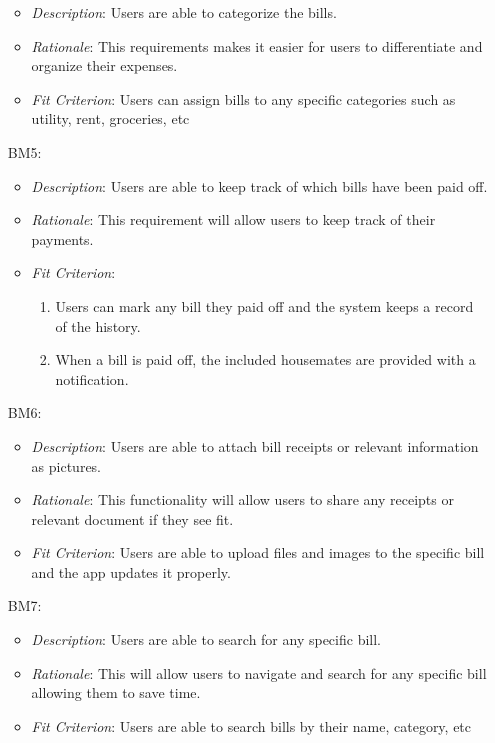 \documentclass[12pt]{article}
\begin{document}
\begin{itemize}
\begin{itemize}
        \item \textit{Description}: Users are able to categorize the bills.
        \item \textit{Rationale}: This requirements makes it easier for users to differentiate and organize their expenses.
        \item \textit{Fit Criterion}: Users can assign bills to any specific categories such as utility, rent, groceries, etc
    \end{itemize}
    \item[BM5:] 
    \begin{itemize}
        \item \textit{Description}: Users are able to keep track of which bills have been paid off.
        \item \textit{Rationale}: This requirement will allow users to keep track of their payments.
        \item \textit{Fit Criterion}: 
        \begin{enumerate}
            \item Users can mark any bill they paid off and the system keeps a record of the history.
            \item When a bill is paid off, the included housemates are provided with a notification.
        \end{enumerate}
    \end{itemize}
    \item[BM6:] 
    \begin{itemize}
        \item \textit{Description}: Users are able to attach bill receipts or relevant information as pictures.
        \item \textit{Rationale}: This functionality will allow users to share any receipts or relevant document if they see fit.
        \item \textit{Fit Criterion}: Users are able to upload files and images to the specific bill and the app updates it properly.
    \end{itemize}
    \item[BM7:] 
    \begin{itemize}
        \item \textit{Description}: Users are able to search for any specific bill.
        \item \textit{Rationale}: This will allow users to navigate and search for any specific bill allowing them to save time.
        \item \textit{Fit Criterion}: Users are able to search bills by their name, category, etc
    \end{itemize}
\end{itemize}
\end{document}
